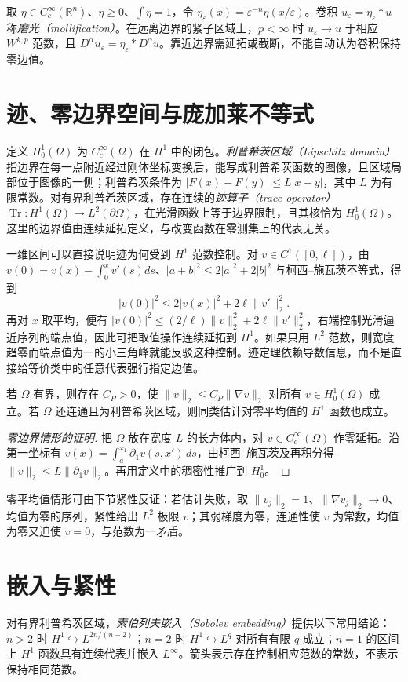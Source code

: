 取 $\eta\in C_c^\infty(\mathbb R^n)$、$\eta\ge0$、$\int\eta=1$，令 $\eta_\varepsilon(x)=\varepsilon^{-n}\eta(x/\varepsilon)$。卷积 $u_\varepsilon=\eta_\varepsilon*u$ 称\emph{磨光（mollification）}。在远离边界的紧子区域上，$p<\infty$ 时 $u_\varepsilon\to u$ 于相应 $W^{k,p}$ 范数，且 $D^\alpha u_\varepsilon=\eta_\varepsilon*D^\alpha u$。靠近边界需延拓或截断，不能自动认为卷积保持零边值。

\section{迹、零边界空间与庞加莱不等式}
定义 $H_0^1(\Omega)$ 为 $C_c^\infty(\Omega)$ 在 $H^1$ 中的闭包。\emph{利普希茨区域（Lipschitz domain）}指边界在每一点附近经过刚体坐标变换后，能写成利普希茨函数的图像，且区域局部位于图像的一侧；利普希茨条件为 $|F(x)-F(y)|\le L|x-y|$，其中 $L$ 为有限常数。对有界利普希茨区域，存在连续的\emph{迹算子（trace operator）}$\operatorname{Tr}:H^1(\Omega)\to L^2(\partial\Omega)$，在光滑函数上等于边界限制，且其核恰为 $H_0^1(\Omega)$。这里的边界值由连续延拓定义，与改变函数在零测集上的代表无关。

一维区间可以直接说明迹为何受到 $H^1$ 范数控制。对 $v\in C^1([0,\ell])$，由 $v(0)=v(x)-\int_0^xv'(s)ds$、$|a+b|^2\le2|a|^2+2|b|^2$ 与柯西--施瓦茨不等式，得到
\[
 |v(0)|^2\le2|v(x)|^2+2\ell\|v'\|_2^2.
\]
再对 $x$ 取平均，便有 $|v(0)|^2\le(2/\ell)\|v\|_2^2+2\ell\|v'\|_2^2$，右端控制光滑逼近序列的端点值，因此可把取值操作连续延拓到 $H^1$。如果只用 $L^2$ 范数，则宽度趋零而端点值为一的小三角峰就能反驳这种控制。迹定理依赖导数信息，而不是直接给等价类中的任意代表强行指定边值。

\begin{theorem}[庞加莱不等式]
若 $\Omega$ 有界，则存在 $C_P>0$，使 $\|v\|_2\le C_P\|\nabla v\|_2$ 对所有 $v\in H_0^1(\Omega)$ 成立。若 $\Omega$ 还连通且为利普希茨区域，则同类估计对零平均值的 $H^1$ 函数也成立。
\end{theorem}
\begin{proof}[零边界情形的证明]
把 $\Omega$ 放在宽度 $L$ 的长方体内，对 $v\in C_c^\infty(\Omega)$ 作零延拓。沿第一坐标有 $v(x)=\int_a^{x_1}\partial_1v(s,x')\,ds$，由柯西--施瓦茨及再积分得 $\|v\|_2\le L\|\partial_1v\|_2$。再用定义中的稠密性推广到 $H_0^1$。
\end{proof}
零平均值情形可由下节紧性反证：若估计失败，取 $\|v_j\|_2=1$、$\|\nabla v_j\|_2\to0$、均值为零的序列，紧性给出 $L^2$ 极限 $v$；其弱梯度为零，连通性使 $v$ 为常数，均值为零又迫使 $v=0$，与范数为一矛盾。

\section{嵌入与紧性}
对有界利普希茨区域，\emph{索伯列夫嵌入（Sobolev embedding）}提供以下常用结论：$n>2$ 时 $H^1\hookrightarrow L^{2n/(n-2)}$；$n=2$ 时 $H^1\hookrightarrow L^q$ 对所有有限 $q$ 成立；$n=1$ 的区间上 $H^1$ 函数具有连续代表并嵌入 $L^\infty$。箭头表示存在控制相应范数的常数，不表示保持相同范数。

